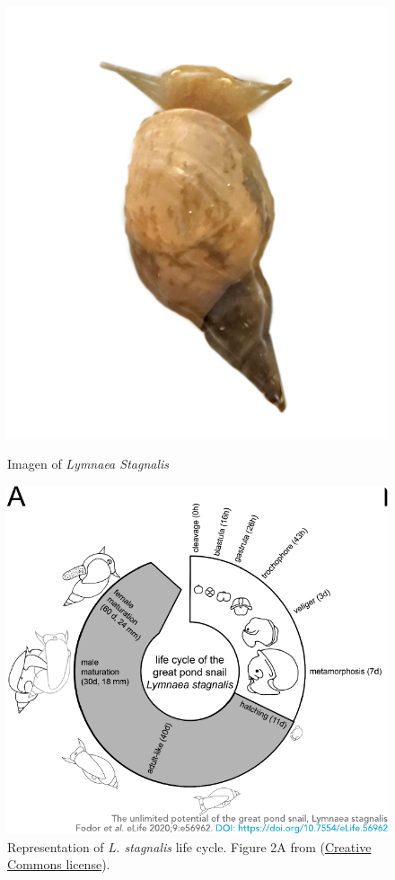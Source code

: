 \begin{figure}[htb!]
	\begin{minipage}{0.35\textwidth}
		\centering
		\includegraphics[width=\linewidth]{img/intro/lymnaea.png} 
		\caption{Imagen of \textit{Lymnaea Stagnalis}}
		\label{fig:snail spanish}
	\end{minipage}
	\hfill
	\begin{minipage}{0.65\textwidth}
		\centering
		\includegraphics[width=\textwidth]{img/intro/lymnaea_life_cycle.pdf}
		\caption{Representation of \textit{L. stagnalis} life cycle. Figure 2A from \cite{fodor_unlimited_2020} (\href{http://creativecommons.org/licenses/by/4.0/}{Creative Commons license}).}
		\label{fig:lymnaea_life_cycle spanish}
	\end{minipage}
\end{figure}


